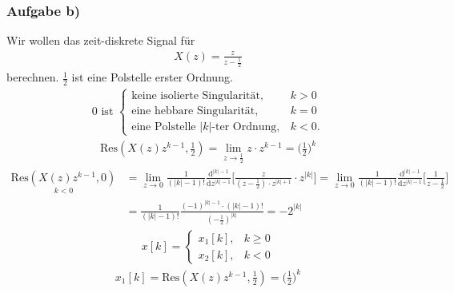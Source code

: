 \documentclass[11pt,a4paper,DIV=12]{scrartcl}
\begin{document}
\subsubsection{Aufgabe b)}
Wir wollen das zeit-diskrete Signal für
\begin{align}
	X(z)=\frac{z}{z-\frac{1}{2}}
\end{align}
berechnen.
$\frac{1}{2}$ ist eine Polstelle erster Ordnung. \\
\begin{align}
	0\text{ ist }
	\begin{cases}
		\text{keine isolierte Singularität}, &k > 0 \\
		\text{eine hebbare Singularität}, &k=0 \\
		\text{eine Polstelle }|k|\text{-ter Ordnung}, &k < 0.
	\end{cases}
\end{align}
\begin{align}
	\mathrm{Res}(X(z)z^{k-1},\frac{1}{2})=\lim\limits_{z\rightarrow\frac{1}{2}}z\cdot z^{k-1}=\bigg (\frac{1}{2} \bigg)^k
\end{align}
\begin{align}
	\underset{k<0}{\mathrm{Res}(X(z)z^{k-1},0)}&=\lim\limits_{z\rightarrow0}\frac{1}{(|k|-1)!}\frac{\mathrm{d}^{|k|-1}}{\mathrm{d}z^{|k|-1}}\Bigg [\frac{z}{(z-\frac{1}{2})\cdot z^{|k|+1}}\cdot z^{|k|}\Bigg]=\lim\limits_{z\rightarrow0}\frac{1}{(|k|-1)!}\frac{\mathrm{d}^{|k|-1}}{\mathrm{d}z^{|k|-1}}\Bigg [\frac{1}{z-\frac{1}{2}}\Bigg]\nonumber\\
	&=\frac{1}{(|k|-1)!}\frac{(-1)^{|k|-1}\cdot (|k|-1)!}{(-\frac{1}{2})^{|k|}}=-2^{|k|}
\end{align}
\begin{align}
	x[k]=\begin{cases}
		x_1[k], &k\geq 0 \\
		x_2[k], &k<0
	\end{cases}
\end{align}
\begin{align}
	x_1[k]=\mathrm{Res}(X(z)z^{k-1},\frac{1}{2})=\bigg( \frac{1}{2} \bigg )^k
\end{align}
\end{document}
